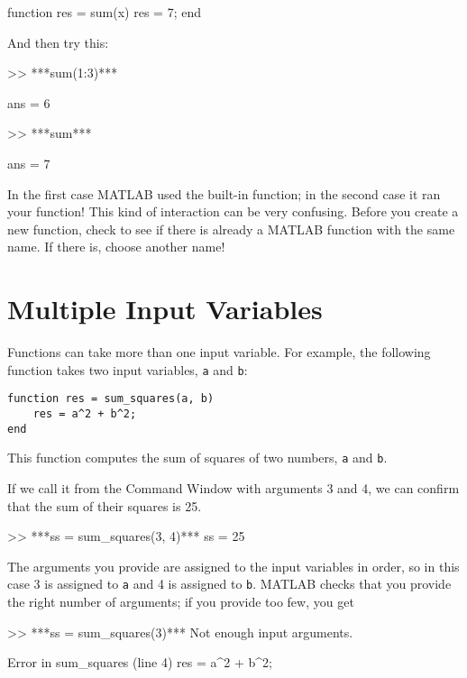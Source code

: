 
\begin{code}
function res = sum(x)
   res = 7;
end
\end{code}

And then try this:

\begin{code}
>> ***sum(1:3)***

ans = 6

>> ***sum***

ans = 7
\end{code}

In the first case MATLAB used the built-in function; in the second
case it ran your function!  This kind of interaction can be very
confusing.  Before you create a new function, check to see if there is
already a MATLAB function with the same name.  If there is, choose
another name!

\section{Multiple Input Variables}
\label{hypotenuse}


Functions can take more than one input variable.
For example, the following function takes two input variables,
{\tt a} and {\tt b}:

\begin{lstlisting}[caption={A function that computes the sum of squares of two numbers}, label={lst:hyp_function}]
function res = sum_squares(a, b)
    res = a^2 + b^2;
end
\end{lstlisting}
  
This function computes the sum of squares of two numbers, {\tt a}
and {\tt b}.

If we call it from the Command Window with arguments 3 and 4, we can
confirm that the sum of their squares is 25.

\begin{code}
>> ***ss = sum_squares(3, 4)***
ss = 25
\end{code}

The arguments you provide are assigned to the input variables in
order, so in this case 3 is assigned to {\tt a} and 4 is assigned to
{\tt b}.  MATLAB checks that you provide the right number of arguments;
if you provide too few, you get

\begin{code}
>> ***ss = sum_squares(3)***
Not enough input arguments.

Error in sum_squares (line 4)
    res = a^2 + b^2;
\end{code}

